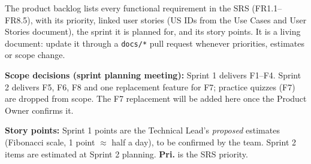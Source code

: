 \documentclass[10pt,a4paper]{article}
\begin{document}
\makedoctitle

The product backlog lists every functional requirement in the SRS (FR1.1--FR8.5), with its priority, linked user stories (US IDs from the Use Cases and User Stories document), the sprint it is planned for, and its story points. It is a living document: update it through a \texttt{docs/*} pull request whenever priorities, estimates or scope change.

\textbf{Scope decisions (sprint planning meeting):} Sprint 1 delivers F1--F4. Sprint 2 delivers F5, F6, F8 and one replacement feature for F7; practice quizzes (F7) are dropped from scope. The F7 replacement will be added here once the Product Owner confirms it.

\textbf{Story points:} Sprint 1 points are the Technical Lead's \emph{proposed} estimates (Fibonacci scale, 1 point $\approx$ half a day), to be confirmed by the team. Sprint 2 items are estimated at Sprint 2 planning. \textbf{Pri.} is the SRS priority.
\end{document}
